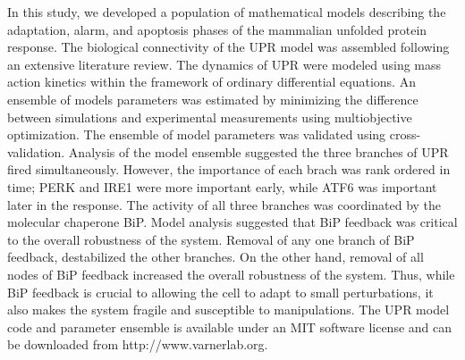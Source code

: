 \documentclass[fleqn,10pt]{wlscirep}
\begin{document}

In this study, we developed a population of mathematical models describing the adaptation, alarm, and apoptosis phases of the mammalian unfolded protein response.
The biological connectivity of the UPR model was assembled following an extensive literature review.
The dynamics of UPR were modeled using mass action kinetics within the framework of ordinary differential equations.
An ensemble of models parameters was estimated by minimizing the difference between simulations and experimental measurements using multiobjective optimization.
The ensemble of model parameters was validated using cross-validation.
Analysis of the model ensemble suggested the three branches of UPR fired simultaneously.
However, the importance of each brach was rank ordered in time; PERK and IRE1 were more important early, while ATF6 was important later in the response.
The activity of all three branches was coordinated by the molecular chaperone BiP.
Model analysis suggested that BiP feedback was critical to the overall robustness of the system.
Removal of any one branch of BiP feedback, destabilized the other branches.
On the other hand, removal of all nodes of BiP feedback increased the overall robustness of the system.
Thus, while BiP feedback is crucial to allowing the cell to adapt to small perturbations, it also makes the system fragile and susceptible to manipulations.
The UPR model code and parameter ensemble is available under an MIT software license and can be downloaded from http://www.varnerlab.org.
\end{document}
